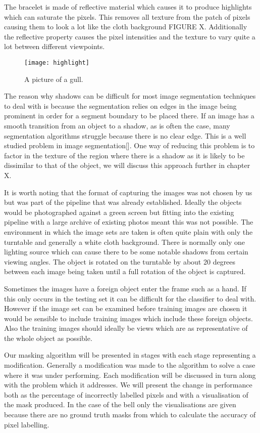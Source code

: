 \documentclass[12pt]{IIBproject}
\begin{document}
The bracelet is made of reflective material which causes it to produce highlights which can saturate the pixels. This removes all texture from the patch of pixels causing them to look a lot like the cloth background FIGURE X. Additionally the reflective property causes the pixel intensities and the texture to vary quite a lot between different viewpoints.
\begin{figure}[H]
  \caption{A picture of a gull.}
  \centering
    \texttt{[image: highlight]}
\end{figure}
The reason why shadows can be difficult for most image segmentation techniques to deal with is because the segmentation relies on edges in the image being prominent in order for a segment boundary to be placed there. If an image has a smooth transition from an object to a shadow, as is often the case, many segmentation algorithms struggle because there is no clear edge. This is a well studied problem in image segmentation[]. One way of reducing this problem is to factor in the texture of the region where there is a shadow as it is likely to be dissimilar to that of the object, we will discuss this approach further in chapter X. 

It is worth noting that the format of capturing the images was not chosen by us but was part of the pipeline that was already established. Ideally the objects would be photographed against a green screen but fitting into the existing pipeline with a large archive of existing photos meant this was not possible. 
The environment in which the image sets are taken is often quite plain with only the turntable and generally a white cloth background. There is normally only one lighting source which can cause there to be some notable shadows from certain viewing angles. The object is rotated on the turntable by about 20 degrees between each image being taken until a full rotation of the object is captured. 

Sometimes the images have a foreign object enter the frame such as a hand. If this only occurs in the testing set it can be difficult for the classifier to deal with. However if the image set can be examined before training images are chosen it would be sensible to include training images which include these foreign objects. Also the training images should ideally be views which are as representative of the whole object as possible.

Our masking algorithm will be presented in stages with each stage representing a modification. Generally a modification was made to the algorithm to solve a case where it was under performing. Each modification will be discussed in turn along with the problem which it addresses. We will present the change in performance both as the percentage of incorrectly labelled pixels and with a visualisation of the mask produced. In the case of the bell only the visualisations are given because there are no ground truth masks from which to calculate the accuracy of pixel labelling.
\end{document}
